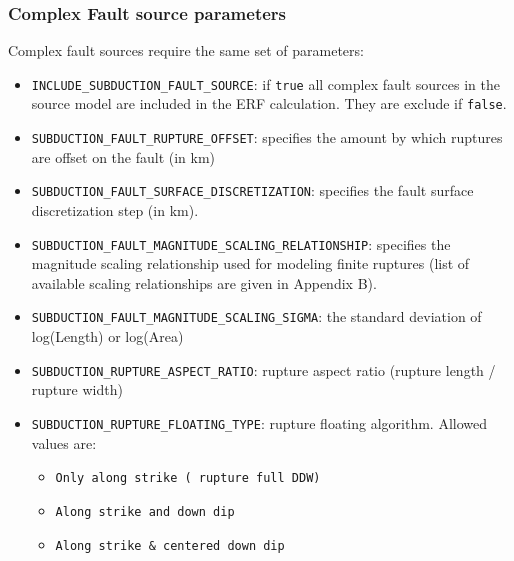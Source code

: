 \subsubsection{Complex Fault source parameters}
Complex fault sources require the same set of parameters:
\begin{itemize}
\item \Verb+INCLUDE_SUBDUCTION_FAULT_SOURCE+: if \Verb+true+ all complex fault sources in the source model are included in the ERF calculation. They are exclude if \Verb+false+.
\item \Verb+SUBDUCTION_FAULT_RUPTURE_OFFSET+: specifies the amount by which ruptures are offset on the fault (in km)
\item \Verb+SUBDUCTION_FAULT_SURFACE_DISCRETIZATION+: specifies the fault surface discretization step (in km).
\item \Verb+SUBDUCTION_FAULT_MAGNITUDE_SCALING_RELATIONSHIP+: specifies the magnitude scaling relationship used for modeling finite ruptures (list of available scaling relationships are given in Appendix B).
\item \Verb+SUBDUCTION_FAULT_MAGNITUDE_SCALING_SIGMA+: the standard deviation of log(Length) or log(Area)
\item \Verb+SUBDUCTION_RUPTURE_ASPECT_RATIO+: rupture aspect ratio (rupture length / rupture width)
\item \Verb+SUBDUCTION_RUPTURE_FLOATING_TYPE+: rupture floating algorithm. Allowed values are:
\begin{itemize}
\item \Verb+Only along strike ( rupture full DDW)+
\item \Verb+Along strike and down dip+
\item \Verb+Along strike & centered down dip+
\end{itemize}
\end{itemize}

